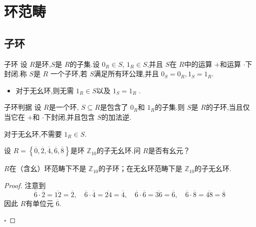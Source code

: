 \documentclass[lang=cn,12pt,color=green,fontset=none,pad]{elegantbook}
\begin{document}
\chapter{环范畴}


\section{子环}
\begin{definition}{子环}
    设 $ R $是环,$ S $是 $ R $的子集.设 $ 0_{R} \in S $, $ 1_{R}\in S $,并且 $ S $在 $ R $中的运算 $ +  $和运算 $ \cdot  $下封闭.称 $ S $是 $ R $ 一个子环,若 $ S $满足所有环公理,并且 $ 0_{S}=0_{R},1_{S}= 1_{R} $.            
\end{definition}
\begin{remark}
  \begin{itemize}
    \item   对于无幺环,则无需 $ 1_{R}\in S $以及 $ 1_{S}= 1_{R} $ .
  \end{itemize}
  
\end{remark}

\begin{proposition}{子环判据}\label{subring-cri}
    设 $ R $是一个环, $ S\subseteq R $是包含了 $ 0_{R} $和 $ 1_{R} $的子集.则 $ S $是 $ R $的子环,当且仅当它在 $ +  $和 $ \cdot  $下封闭,并且包含 $ S $的加法逆.      
\end{proposition}

\begin{remark}
    对于无幺环,不需要 \(  1_{R} \in S  \). 
\end{remark}

\begin{problemset}
    \item 设 \(  R= \left\{  \overline{0},\overline{2},\overline{4},\overline{6},\overline{8} \right\}  \)是环 \(  \mathbb{Z} _{10}  \)的子无幺环.问 \(  R  \)是否有幺元？   
    
    \begin{remark}
        \(  R  \)在（含幺）环范畴下不是 \(  \mathbb{Z} _{10}  \)的子环；在无幺环范畴下是 \(  \mathbb{Z} _{10}  \)的子无幺环.
    \end{remark}

    \begin{proof}
        注意到 \[
        \overline{6}\cdot \overline{2}= \overline{12}= \overline{2},\quad \overline{6}\cdot \overline{4}= \overline{24}= \overline{4},\quad \overline{6}\cdot \overline{6}= \overline{36}= \overline{6},\quad \overline{6}\cdot \overline{8}= \overline{48}= \overline{8}
        \]因此 \(  R  \)有单位元 \(  \overline{6}  \).  
    
        \hfill $\square$
    \end{proof}
\end{problemset}
\end{document}
